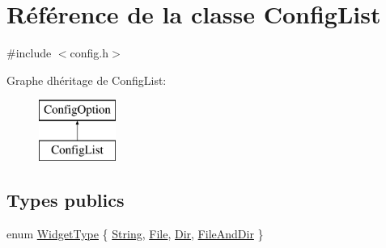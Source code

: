 \hypertarget{class_config_list}{}\section{Référence de la classe Config\+List}
\label{class_config_list}


{\ttfamily \#include $<$config.\+h$>$}

Graphe d\textquotesingle{}héritage de Config\+List\+:\begin{figure}[H]
\begin{center}
\leavevmode
\includegraphics[height=2.000000cm]{class_config_list}
\end{center}
\end{figure}
\subsection*{Types publics}
\begin{DoxyCompactItemize}
\item 
enum \hyperlink{class_config_list_a562e3dbe5fc70f1af7ed4e748dae0ae9}{Widget\+Type} \{ \hyperlink{class_config_list_a562e3dbe5fc70f1af7ed4e748dae0ae9aa9954588024495126e9800e6a8fe6609}{String}, 
\hyperlink{class_config_list_a562e3dbe5fc70f1af7ed4e748dae0ae9ad849531b1086e92d907f6eaeca605d19}{File}, 
\hyperlink{class_config_list_a562e3dbe5fc70f1af7ed4e748dae0ae9af9f869ef1f20f387f022bc6a95362f36}{Dir}, 
\hyperlink{class_config_list_a562e3dbe5fc70f1af7ed4e748dae0ae9a6e2af7234864ed6dede734bc8fd09003}{File\+And\+Dir}
 \}
\end{DoxyCompactItemize}

